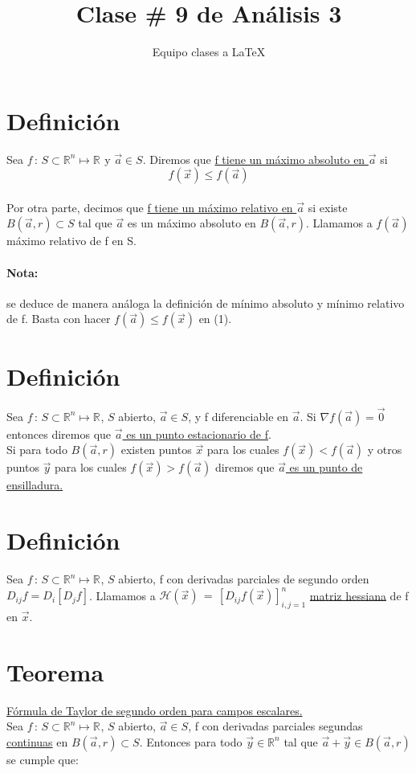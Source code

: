 \documentclass[12pt]{article}
\title{Clase \# 9 de Análisis 3}
\author{Equipo clases a \LaTeX}
\newcommand{\teorema}{\section{Teorema}}
\newcommand{\definicion}{\section{Definición}}
\newcommand{\Rn}[1]{\mathbb{R}^{#1}}
\begin{document}
	
	\maketitle
	
	\definicion
	
	Sea $f \, : \, S \subset \Rn{n} \mapsto \Rn{}$ y $\vec{a} \in S$. Diremos que \underline{f tiene un máximo absoluto en $\vec{a}$} si \\
	\begin{equation}
	    f(\vec{x})  \leqslant f(\vec{a})
	\end{equation} \\

	Por otra parte, decimos que \underline{f tiene un máximo relativo en $\vec{a}$} si existe $B(\vec{a}, r) \subset S$ tal que $\vec{a}$ es un máximo absoluto en $B(\vec{a}, r)$. Llamamos a $f(\vec{a}) $ máximo relativo de f en S.
	
	\paragraph{Nota:} se deduce de manera análoga la definición de mínimo absoluto y mínimo relativo de f. Basta con hacer $ f(\vec{a}) \leqslant  f(\vec{x})$ en (1).
	
	\definicion
	
	Sea $f \, : \, S \subset \Rn{n} \mapsto \Rn{}$, $S$ abierto, $\vec{a} \in S$, y f diferenciable en $\vec{a}$. Si $\nabla f(\vec{a}) = \vec{0}$ entonces diremos que \underline{$\vec{a}$ es un punto estacionario de f}. \\
	
	Si para todo $B(\vec{a}, r)$ existen puntos $\vec{x}$ para los cuales $f(\vec{x}) < f(\vec{a}) $ y otros puntos $\vec{y}$ para los cuales $f(\vec{x}) > f(\vec{a})$ diremos que \underline{$\vec{a}$ es un punto de ensilladura.}
	
	\definicion
	Sea $f \, : \, S \subset \Rn{n} \mapsto \Rn{}$, $S$ abierto, f con derivadas parciales de segundo orden \linebreak $D_{ij} f = D_i[ D_j f]$. Llamamos a $\mathscr{H}(\vec{x}) \, = \, [D_{ij} f(\vec{x})]_{i,j = 1} ^{n}$ \underline{matriz hessiana} de f en $\vec{x}$.
	
	\pagebreak
	
	\teorema
	\underline{Fórmula de Taylor de segundo orden para campos escalares.} \\
	
	Sea $f \, : \, S \subset \Rn{n} \mapsto \Rn{}$, $S$ abierto, $\vec{a} \in S$, f con derivadas parciales segundas \underline{continuas} en $B(\vec{a}, r) \subset S$. Entonces para todo $\vec{y} \in \Rn{n}$ tal que $\vec{a} + \vec{y} \in B(\vec{a}, r)$ se cumple que:
	
\end{document}
